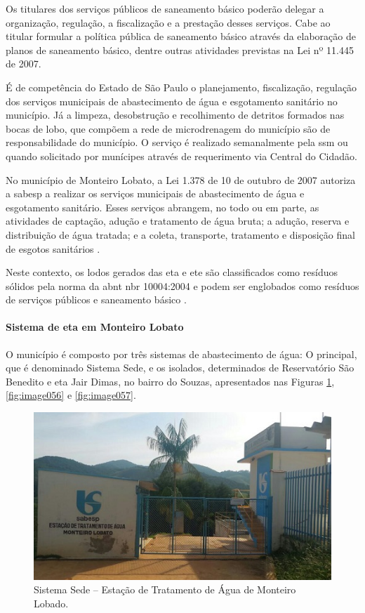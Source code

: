	Os titulares dos serviços públicos de saneamento básico poderão delegar a organização, regulação, a fiscalização e a prestação desses serviços. Cabe ao titular formular a política pública de saneamento básico através da elaboração de planos de saneamento básico, dentre outras atividades previstas na Lei nº 11.445 de 2007.
	
	É de competência do Estado de São Paulo o planejamento, fiscalização, regulação dos serviços municipais de abastecimento de água e esgotamento sanitário no município. Já a limpeza, desobstrução e recolhimento de detritos formados nas bocas de lobo, que compõem a rede de microdrenagem do município são de responsabilidade do município. O serviço é realizado semanalmente pela \gls{ssm} ou quando solicitado por munícipes através de requerimento via Central do Cidadão.
	
	No município de Monteiro Lobato, a Lei 1.378 de 10 de outubro de 2007 autoriza a \gls{sabesp} a realizar os serviços municipais de abastecimento de água e esgotamento sanitário. Esses serviços abrangem, no todo ou em parte, as atividades de captação, adução e tratamento de água bruta; a adução, reserva e distribuição de água tratada; e a coleta, transporte, tratamento e disposição final de esgotos sanitários \cite{MonteiroLobato2007}.

	Neste contexto, os lodos gerados das \gls{eta} e \gls{ete} são classificados como resíduos sólidos pela norma da \gls{abnt} \gls{nbr} 10004:2004 e podem ser englobados como resíduos de serviços públicos e saneamento básico \cite{PERS2014}.
	
	\paragraph{\textbf{Sistema de \gls{eta} em Monteiro Lobato}}
	
	O município é composto por três sistemas de abastecimento de água: O principal, que é denominado Sistema Sede, e os isolados, determinados de Reservatório São Benedito e \gls{eta} Jair Dimas, no bairro do Souzas, apresentados nas Figuras \ref{fig:image055}, \ref{fig:image056} e \ref{fig:image057}. 
	
	\begin{figure}
		\centering
		\includegraphics[width=0.75\linewidth]{produtos/prodtres/image055}
		\caption{Sistema Sede – Estação de Tratamento de Água de Monteiro Lobado.}
		\label{fig:image055}
	\end{figure}

